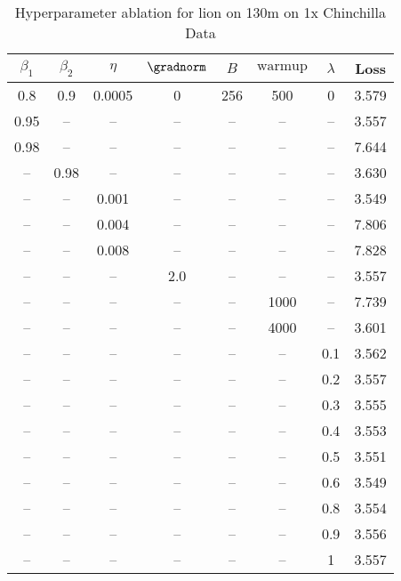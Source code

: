 \begin{table}[h!]
\centering
\caption{Hyperparameter ablation for lion on 130m on 1x Chinchilla Data}
\label{tab:ablation_lion_130m_on_1x_chinchilla_data}
\begin{tabular}{cccccccc}
\toprule
$\beta_1$ & $\beta_2$ & $\eta$ & $\gradnorm$ & $B$ & $\mathrm{warmup}$ & $\lambda$ & Loss \\
\midrule
0.8 & 0.9 & 0.0005 & 0 & 256 & 500 & 0 & 3.579 \\
\midrule
0.95 & -- & -- & -- & -- & -- & -- & 3.557 \\
0.98 & -- & -- & -- & -- & -- & -- & 7.644 \\
-- & 0.98 & -- & -- & -- & -- & -- & 3.630 \\
-- & -- & 0.001 & -- & -- & -- & -- & 3.549 \\
-- & -- & 0.004 & -- & -- & -- & -- & 7.806 \\
-- & -- & 0.008 & -- & -- & -- & -- & 7.828 \\
-- & -- & -- & 2.0 & -- & -- & -- & 3.557 \\
-- & -- & -- & -- & -- & 1000 & -- & 7.739 \\
-- & -- & -- & -- & -- & 4000 & -- & 3.601 \\
-- & -- & -- & -- & -- & -- & 0.1 & 3.562 \\
-- & -- & -- & -- & -- & -- & 0.2 & 3.557 \\
-- & -- & -- & -- & -- & -- & 0.3 & 3.555 \\
-- & -- & -- & -- & -- & -- & 0.4 & 3.553 \\
-- & -- & -- & -- & -- & -- & 0.5 & 3.551 \\
-- & -- & -- & -- & -- & -- & 0.6 & 3.549 \\
-- & -- & -- & -- & -- & -- & 0.8 & 3.554 \\
-- & -- & -- & -- & -- & -- & 0.9 & 3.556 \\
-- & -- & -- & -- & -- & -- & 1 & 3.557 \\
\bottomrule
\end{tabular}
\end{table}

